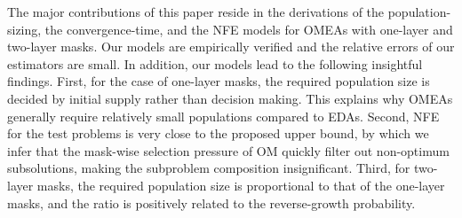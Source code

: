 \documentclass{sig-alternate}
\begin{document}

The major contributions of this paper reside in the derivations of
the population-sizing, the convergence-time,
and the NFE models for OMEAs with one-layer and two-layer masks.
Our models are empirically verified and the relative errors of our estimators are small.
In addition, our models lead to the following insightful findings.
First, for the case of one-layer masks, the required population size is decided by initial supply rather than decision making.
This explains why OMEAs generally require relatively small populations compared to EDAs.
Second, NFE for the test problems is very close to the proposed upper bound,
by which we infer that the mask-wise selection pressure of OM quickly filter out non-optimum subsolutions, making the subproblem composition insignificant.
Third, for two-layer masks,
the required population size is proportional to that of the one-layer masks,
and the ratio is positively related to the reverse-growth probability.
\end{document}

